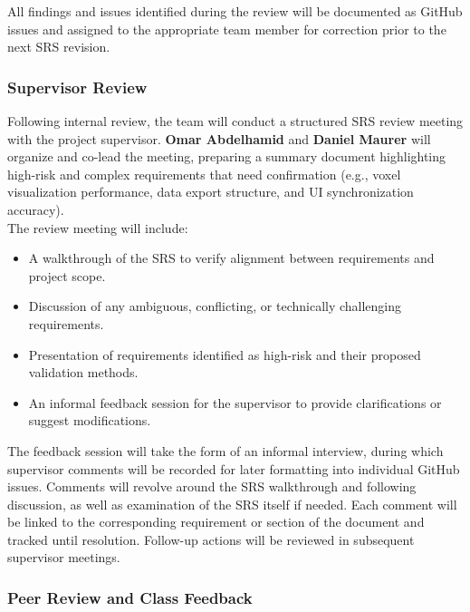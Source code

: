 \documentclass[12pt, titlepage]{article}
\begin{document}
\noindent All findings and issues identified during the review will be documented as GitHub issues and assigned to the appropriate team member for correction prior to the next SRS revision.\\

\subsubsection{Supervisor Review}

\noindent Following internal review, the team will conduct a structured SRS review meeting with the project supervisor. \textbf{Omar Abdelhamid} and \textbf{Daniel Maurer} will organize and co-lead the meeting, preparing a summary document highlighting high-risk and complex requirements that need confirmation (e.g., voxel visualization performance, data export structure, and UI synchronization accuracy).\\

\noindent The review meeting will include:\\

\begin{itemize}
  \item A walkthrough of the SRS to verify alignment between requirements and project scope.
  \item Discussion of any ambiguous, conflicting, or technically challenging requirements.
  \item Presentation of requirements identified as high-risk and their proposed validation methods.
  \item An informal feedback session for the supervisor to provide clarifications or suggest modifications.
\end{itemize}

\noindent The feedback session will take the form of an informal interview, during which supervisor comments will be recorded for later formatting into individual GitHub issues. Comments will revolve around the SRS walkthrough and following discussion, as well as examination of the SRS itself if needed. Each comment will be linked to the corresponding requirement or section of the document and tracked until resolution. Follow-up actions will be reviewed in subsequent supervisor meetings.\\

\subsubsection{Peer Review and Class Feedback}
\end{document}
